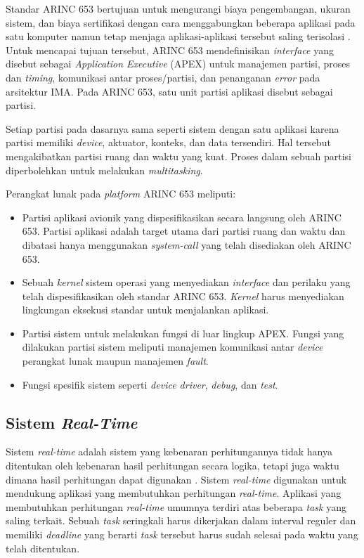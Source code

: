Standar ARINC 653 bertujuan untuk mengurangi biaya pengembangan, ukuran sistem, dan biaya sertifikasi dengan cara menggabungkan beberapa aplikasi pada satu komputer namun tetap menjaga aplikasi-aplikasi tersebut saling terisolasi \citep[pp.~3-30]{AirlinesElectronicEngineeringCommittee2012}.
Untuk mencapai tujuan tersebut, ARINC 653 mendefinisikan \textit{interface} yang disebut sebagai \textit{Application Executive} (APEX) untuk manajemen partisi, proses dan \textit{timing}, komunikasi antar proses/partisi, dan penanganan \textit{error} pada arsitektur IMA.
Pada ARINC 653, satu unit partisi aplikasi disebut sebagai partisi.

Setiap partisi pada dasarnya sama seperti sistem dengan satu aplikasi karena partisi memiliki \textit{device}, aktuator, konteks, dan data tersendiri.
Hal tersebut mengakibatkan partisi ruang dan waktu yang kuat.
Proses dalam sebuah partisi diperbolehkan untuk melakukan \textit{multitasking}.

Perangkat lunak pada \textit{platform} ARINC 653 meliputi:
\begin{itemize}
    \item Partisi aplikasi avionik yang dispesifikasikan secara langsung oleh ARINC 653. Partisi aplikasi adalah target utama dari partisi ruang dan waktu dan dibatasi hanya menggunakan \textit{system-call} yang telah disediakan oleh ARINC 653.
    \item Sebuah \textit{kernel} sistem operasi yang menyediakan \textit{interface} dan perilaku yang telah dispesifikasikan oleh standar ARINC 653. \textit{Kernel} harus menyediakan lingkungan eksekusi standar untuk menjalankan aplikasi.
    \item Partisi sistem untuk melakukan fungsi di luar lingkup APEX. Fungsi yang dilakukan partisi sistem meliputi manajemen komunikasi antar \textit{device} perangkat lunak maupun manajemen \textit{fault}.
    \item Fungsi spesifik sistem seperti \textit{device driver}, \textit{debug}, dan \textit{test}.
\end{itemize}

\subsection{Sistem \textit{Real-Time}}

Sistem \textit{real-time} adalah sistem yang kebenaran perhitungannya tidak hanya ditentukan oleh kebenaran hasil perhitungan secara logika, tetapi juga waktu dimana hasil perhitungan dapat digunakan \citep[pp.~6-7]{Shin1994}.
Sistem \textit{real-time} digunakan untuk mendukung aplikasi yang membutuhkan perhitungan \textit{real-time}.
Aplikasi yang membutuhkan perhitungan \textit{real-time} umumnya terdiri atas beberapa \textit{task} yang saling terkait.
Sebuah \textit{task} seringkali harus dikerjakan dalam interval reguler dan memiliki \textit{deadline} yang berarti \textit{task} tersebut harus sudah selesai pada waktu yang telah ditentukan.

